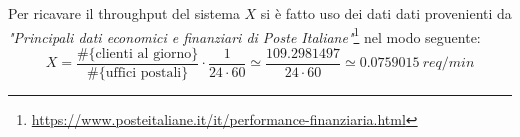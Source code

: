 Per ricavare il throughput del sistema $X$ si è fatto uso dei dati dati provenienti da \textsl{"Principali dati economici e finanziari di Poste Italiane"}\footnote{\url{https://www.posteitaliane.it/it/performance-finanziaria.html}} nel modo seguente:
\begin{equation}
X = \frac{\# \lbrace \text{clienti al giorno} \rbrace}{\# \lbrace \text{uffici postali} \rbrace} \cdot \frac{1}{24 \cdot 60} \simeq \frac{109.2981497}{24 \cdot 60} \simeq 0.0759015\ req/min
\end{equation} 


















